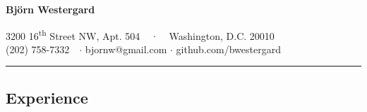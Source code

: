 \documentclass[10pt,letterpaper]{article}
\begin{document}
\begin{center}
	{\Huge \textbf{Björn Westergard}}
	\vspace{.8em}

	3200 16\textsuperscript{th} Street NW, Apt. 504 \ \ {$\cdot$}
	\ \ Washington, D.C. 20010
	\\
	(202) 758-7332\ \ {$\cdot$}
	bjornw@gmail.com {$\cdot$}
	github.com/bwestergard
\end{center}

\begin{center}
	\hrule
	\vspace{-0.4em}
	\subsection*{Experience}
\end{center}
\end{document}
